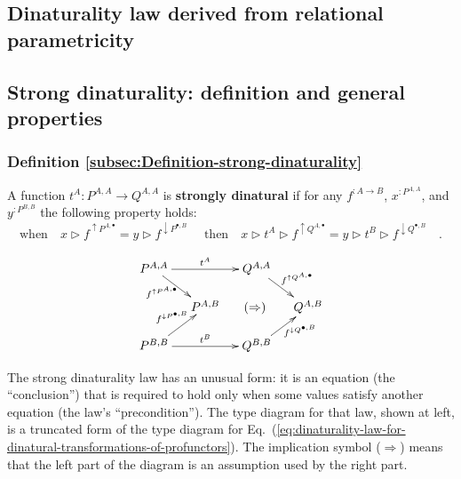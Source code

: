 \subsection{Dinaturality law derived from relational parametricity}

\subsection{Strong dinaturality: definition and general properties\label{subsec:Strong-dinaturality.-General-properties}}

\subsubsection{Definition \label{subsec:Definition-strong-dinaturality}\ref{subsec:Definition-strong-dinaturality}}

A function $t^{A}:P^{A,A}\rightarrow Q^{A,A}$ is \textbf{strongly
dinatural} if for any $f^{:A\rightarrow B}$,
$x^{:P^{A,A}}$, and $y^{:P^{B,B}}$ the following property holds:\vspace{-0.3\baselineskip}
\begin{equation}
\text{when}\quad x\triangleright f^{\uparrow P^{A,\bullet}}=y\triangleright f^{\downarrow P^{\bullet,B}}\quad\text{ then}\quad x\triangleright t^{A}\triangleright f^{\uparrow Q^{A,\bullet}}=y\triangleright t^{B}\triangleright f^{\downarrow Q^{\bullet,B}}\quad.\label{eq:strong-dinaturality-law}
\end{equation}

\begin{wrapfigure}{l}{0.32\columnwidth}%
\vspace{-2.5\baselineskip}
\[
\xymatrix{\xyScaleY{1.2pc}\xyScaleX{1.0pc}P^{A,A}\ar[rd]\sb(0.35){f^{\uparrow P^{A,\bullet}}\negthickspace\negthickspace}\ar[rr]\sp(0.5){t^{A}} &  & Q^{A,A}\ar[rd]\sp(0.5){f^{\uparrow Q^{A,\bullet}}}\\
 & P^{A,B} & \negthickspace(\Rightarrow) & Q^{A,B}\\
P^{B,B}\ar[ru]\sp(0.5){f^{\downarrow P^{\bullet,B}}\negthickspace\negthickspace\negthickspace}\ar[rr]\sp(0.5){t^{B}} &  & Q^{B,B}\ar[ru]\sb(0.65){\negthickspace\negthickspace f^{\downarrow Q^{\bullet,B}}}
}
\]
\vspace{-2\baselineskip}
\end{wrapfigure}%

\noindent The strong dinaturality law has an unusual form: it is an
equation (the \textsf{``}conclusion\textsf{''}) that is required to hold only when
some values satisfy another equation (the law\textsf{'}s \textsf{``}precondition\textsf{''}).
The type diagram for that law, shown at left, is a truncated form
of the type diagram for Eq.~(\ref{eq:dinaturality-law-for-dinatural-transformations-of-profunctors}).
The implication symbol ($\Rightarrow$) means that the left part of
the diagram is an assumption used by the right part.


